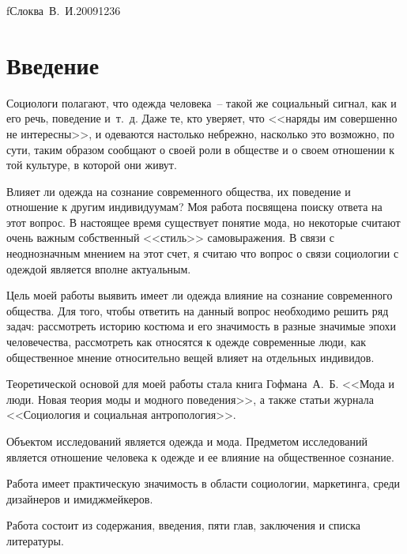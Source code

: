 


    {f}{Слоква~В.~И.}{20091236}
  \onehalfspacing
  \setcounter{page}{2}
  \tableofcontents

  \newpage

  \section*{Введение}
  
  Социологи полагают, что одежда человека~-- такой же социальный сигнал, как и
  его речь, поведение и~т.~д. Даже те, кто уверяет, что <<наряды им совершенно
  не интересны>>, и одеваются настолько небрежно, насколько это возможно, по
  сути, таким образом сообщают о своей роли в обществе и о своем отношении к
  той культуре, в которой они живут.
  
  Влияет ли одежда на сознание современного общества, их поведение и отношение
  к другим индивидуумам? Моя работа посвящена поиску ответа на этот вопрос. В
  настоящее время существует понятие мода, но некоторые считают очень важным
  собственный <<стиль>> самовыражения. В связи с неоднозначным мнением на этот
  счет, я считаю что вопрос о связи социологии с одеждой является вполне
  актуальным.
  
  Цель моей работы выявить имеет ли одежда влияние на сознание современного
  общества. Для того, чтобы ответить на данный вопрос необходимо решить ряд
  задач: рассмотреть историю костюма и его значимость в разные значимые эпохи
  человечества, рассмотреть как относятся к одежде современные люди, как
  общественное мнение относительно вещей влияет на отдельных индивидов.
  
  Теоретической основой для моей работы стала книга Гофмана~А.~Б. <<Мода и
  люди. Новая теория моды и модного поведения>>, а также статьи журнала
  <<Социология и социальная антропология>>.
  
  Объектом исследований является одежда и мода. Предметом исследований является
  отношение человека к одежде и ее влияние на общественное сознание.
  
  Работа имеет практическую значимость в области социологии, маркетинга, среди
  дизайнеров и имиджмейкеров.
  
  Работа состоит из содержания, введения, пяти глав, заключения и списка литературы.
  

